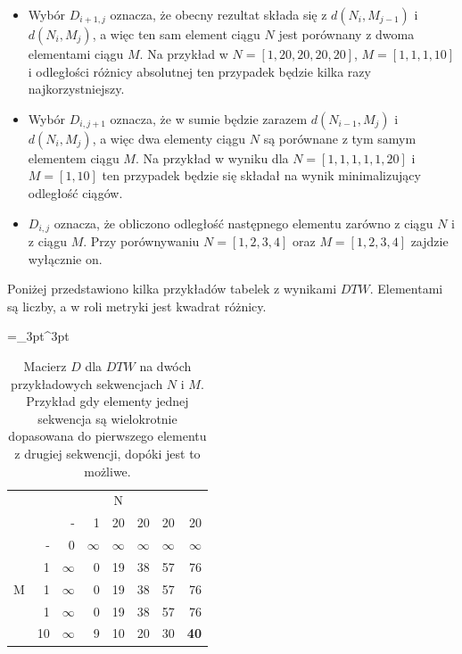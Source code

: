 \begin{itemize}
    \item Wybór $D_{i+1, j}$ oznacza, że obecny rezultat składa się z $d(N_i, M_{j-1})$ i $d(N_i, M_j)$, a więc ten sam element ciągu $N$ jest porównany z dwoma elementami ciągu $M$. Na przykład w $N = [1, 20, 20, 20, 20]$, $M = [1, 1, 1, 10]$ i odległości różnicy absolutnej ten przypadek będzie kilka razy najkorzystniejszy.
    \item Wybór $D_{i, j+1}$ oznacza, że w sumie będzie zarazem $d(N_{i-1}, M_j)$ i $d(N_i, M_j)$, a więc dwa elementy ciągu $N$ są porównane z tym samym elementem ciągu $M$. Na przykład w wyniku dla $N = [1, 1, 1, 1, 1, 20]$ i $ M = [1, 10]$ ten przypadek będzie się składał na wynik minimalizujący odległość ciągów.
    \item $D_{i, j}$ oznacza, że obliczono odległość następnego elementu zarówno z ciągu $N$ i z ciągu $M$. Przy porównywaniu $N = [1, 2, 3, 4]$ oraz $M = [1, 2, 3, 4]$ zajdzie wyłącznie on.
\end{itemize}

Poniżej przedstawiono kilka przykładów tabelek z wynikami $DTW$. Elementami są liczby, a w roli metryki jest kwadrat różnicy.

\begin{table}[H]
    \caption{Macierz $D$ dla $DTW$ na dwóch przykładowych sekwencjach $N$ i $M$. Przykład gdy elementy jednej sekwencja są wielokrotnie dopasowana do pierwszego elementu z drugiej sekwencji, dopóki jest to możliwe.}
    \centering
    \label{tab:dtw_example0}
    \small
    \tabulinesep =_3pt^3pt
    \begin{tabu}{r*{7}{r}}
         & & 
        \\
        & & - & 1 & 20 & 20 & 20 & 20
        \\ \midrule
         & - & 0 & $\infty$ & $\infty$ & $\infty$ & $\infty$ & $\infty$
        \\
        & 1 & $\infty$ & 0 & 19 & 38 & 57 & 76
        \\
        & 1 & $\infty$ & 0 & 19 & 38 & 57 & 76
        \\
        & 1 & $\infty$ & 0 & 19 & 38 & 57 & 76
        \\
        & 10 & $\infty$ & 9 & 10 & 20 & 30 & \textbf{40}
        \\
    \end{tabu}
\end{table}

